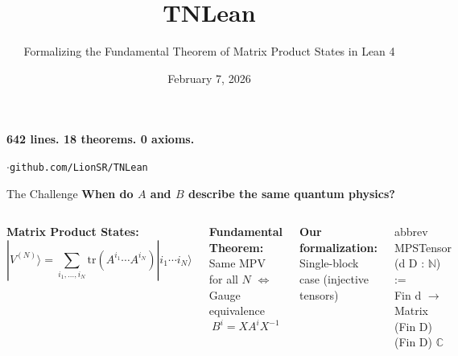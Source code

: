 \documentclass[aspectratio=169,10pt]{beamer}
\title{\textbf{TNLean}}
\subtitle{Formalizing the Fundamental Theorem of Matrix Product States in Lean 4}
\date{February 7, 2026}
\author{}
\begin{document}
\begin{frame}
\titlepage
\vspace{-2em}
\begin{center}
\huge\textcolor{leangreen}{\textbf{642 lines. 18 theorems. 0 axioms.}}

\vspace{0.5em}
{\footnotesize \cite{Cirac2021Matrix}\quad$\cdot$\quad\texttt{github.com/LionSR/TNLean}}
\end{center}
\end{frame}

\begin{frame}{The Challenge}
\textbf{\LARGE When do $A$ and $B$ describe the same quantum physics?}

\vspace{0.5em}
\begin{columns}[T]
\textbf{Matrix Product States:}
\[
|V^{(N)}\rangle = \sum_{i_1,\ldots,i_N} \mathrm{tr}(A^{i_1}\cdots A^{i_N}) |i_1\cdots i_N\rangle
\]

\vspace{0.5em}
\textbf{\textcolor{leangreen}{Fundamental Theorem:}}\\
Same MPV for all $N$ $\Leftrightarrow$ Gauge equivalence
\[
B^i = X A^i X^{-1}
\]

\vspace{0.3em}
\textbf{Our formalization:} Single-block case (injective tensors)

\begin{center}

\vspace{1.5em}
{\ttfamily\small
abbrev MPSTensor (d D : $\mathbb{N}$) :=\\ 
\hspace*{0.5em}Fin d $\to$ Matrix (Fin D) (Fin D) $\mathbb{C}$
}


\end{center}
\end{columns}
\end{frame}
\end{document}
